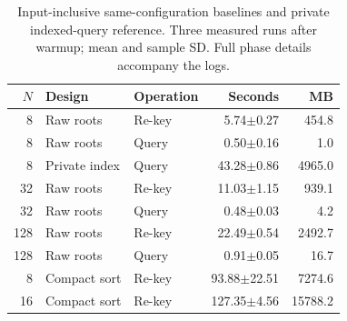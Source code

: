 \begin{table}[t]
\caption{Input-inclusive same-configuration baselines and private indexed-query reference. Three measured runs after warmup; mean and sample SD. Full phase details accompany the logs.}
\label{tab:baselines}\centering\small
\setlength{\tabcolsep}{3pt}
\begin{tabular}{rllrr}
\toprule
$N$ & Design & Operation & Seconds & MB \\
\midrule
8 & Raw roots & Re-key & 5.74$\pm$0.27 & 454.8 \\
8 & Raw roots & Query & 0.50$\pm$0.16 & 1.0 \\
8 & Private index & Query & 43.28$\pm$0.86 & 4965.0 \\
32 & Raw roots & Re-key & 11.03$\pm$1.15 & 939.1 \\
32 & Raw roots & Query & 0.48$\pm$0.03 & 4.2 \\
128 & Raw roots & Re-key & 22.49$\pm$0.54 & 2492.7 \\
128 & Raw roots & Query & 0.91$\pm$0.05 & 16.7 \\
8 & Compact sort & Re-key & 93.88$\pm$22.51 & 7274.6 \\
16 & Compact sort & Re-key & 127.35$\pm$4.56 & 15788.2 \\
\bottomrule
\end{tabular}
\end{table}

